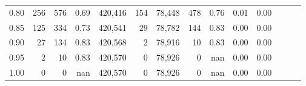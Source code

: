 \begin{tabular}{rrrrrrrrrrrrrr}
0.80 &      256 &     576 &  0.69 &  420,416 &      154 &  78,448 &     478 &  0.76 &  0.01 &      0.00 \\
0.85 &      125 &     334 &  0.73 &  420,541 &       29 &  78,782 &     144 &  0.83 &  0.00 &      0.00 \\
0.90 &       27 &     134 &  0.83 &  420,568 &        2 &  78,916 &      10 &  0.83 &  0.00 &      0.00 \\
0.95 &        2 &      10 &  0.83 &  420,570 &        0 &  78,926 &       0 &   nan &  0.00 &      0.00 \\
1.00 &        0 &       0 &   nan &  420,570 &        0 &  78,926 &       0 &   nan &  0.00 &      0.00 \\
\bottomrule
\end{tabular}
